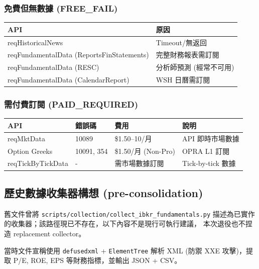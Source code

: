 \documentclass[11pt,a4paper]{article}
\begin{document}
\subsubsection*{免費但無數據 (FREE\_FAIL)}

\begin{table}[H]
\centering
\begin{tabular}{@{}ll@{}}
\toprule
\textbf{API} & \textbf{原因} \\
\midrule
reqHistoricalNews & Timeout/無返回 \\
reqFundamentalData (ReportsFinStatements) & 完整財務報表需訂閱 \\
reqFundamentalData (RESC) & 分析師預測 (經常不可用) \\
reqFundamentalData (CalendarReport) & WSH 日曆需訂閱 \\
\bottomrule
\end{tabular}
\end{table}

\subsubsection*{需付費訂閱 (PAID\_REQUIRED)}

\begin{table}[H]
\centering
\begin{tabular}{@{}llll@{}}
\toprule
\textbf{API} & \textbf{錯誤碼} & \textbf{費用} & \textbf{說明} \\
\midrule
reqMktData & 10089 & \$1.50--10/月 & API 即時市場數據 \\
Option Greeks & 10091, 354 & \$1.50/月 (Non-Pro) & OPRA L1 訂閱 \\
reqTickByTickData & - & 需市場數據訂閱 & Tick-by-tick 數據 \\
\bottomrule
\end{tabular}
\end{table}

\subsection*{歷史數據收集器構想 (pre-consolidation)}

舊文件曾將
\texttt{scripts/collection/collect\_ibkr\_fundamentals.py}
描述為已實作的收集器；該路徑現已不存在，以下內容不是現行可執行建議，
本次退役也不捏造 replacement collector。

當時文件宣稱使用 \texttt{defusedxml} + \texttt{ElementTree} 解析 XML
(防禦 XXE 攻擊)，提取 P/E, ROE, EPS 等財務指標，並輸出 JSON + CSV。
\end{document}
